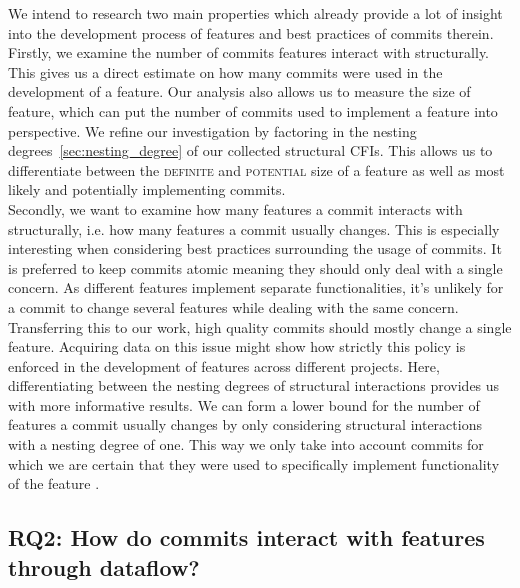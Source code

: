 We intend to research two main properties which already provide a lot of insight into the development process of features and best practices of commits therein. \\
Firstly, we examine the number of commits features interact with structurally. 
This gives us a direct estimate on how many commits were used in the development of a feature.
Our analysis also allows us to measure the size of feature, which can put the number of commits used to implement a feature into perspective.
We refine our investigation by factoring in the nesting degrees~\ref{sec:nesting_degree} of our collected structural CFIs.
This allows us to differentiate between the \textsc{definite} and \textsc{potential} size of a feature as well as most likely and potentially implementing commits. \\
Secondly, we want to examine how many features a commit interacts with structurally, i.e. how many features a commit usually changes. 
This is especially interesting when considering best practices surrounding the usage of commits.
It is preferred to keep commits atomic\cite{hundhausen2021commit_metrics} meaning they should only deal with a single concern.
As different features implement separate functionalities, it's unlikely for a commit to change several features while dealing with the same concern.
Transferring this to our work, high quality commits should mostly change a single feature.
Acquiring data on this issue might show how strictly this policy is enforced in the development of features across different projects. 
Here, differentiating between the nesting degrees of structural interactions provides us with more informative results. 
We can form a lower bound for the number of features a commit usually changes by only considering structural interactions with a nesting degree of one.
This way we only take into account commits for which we are certain that they were used to specifically implement functionality of the feature .

\subsection*{\textbf{RQ2: How do commits interact with features through dataflow?}}

